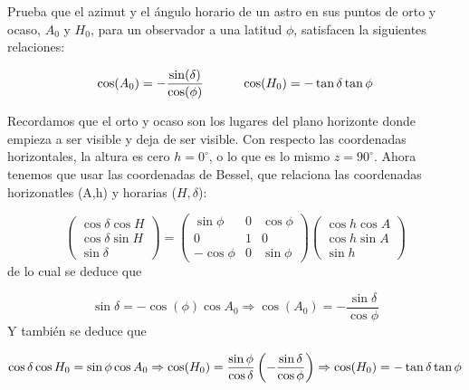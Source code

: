 \tcbstartrecording
\begin{texercise}
	
	Prueba que el azimut y el ángulo horario de un astro en sus puntos de orto y ocaso, $A_0$ y $H_0$, para un observador a una latitud $\phi$, satisfacen la siguientes relaciones:
	
	\begin{equation}
		\cos (A_0) = - \frac{\sin (\delta)}{\cos (\phi)} \quad \quad \quad \cos (H_0) = - \tan \delta \tan \phi
	\end{equation}
	\tcblower

	Recordamos que el orto y ocaso son los lugares del plano horizonte donde empieza a ser visible y deja de ser visible. Con respecto las coordenadas horizontales, la altura es cero $h=0^\circ$, o lo que es lo mismo $z=90^\circ$. Ahora tenemos que usar las coordenadas de Bessel, que relaciona las coordenadas horizonatles (A,h) y horarias ($H,\delta$):
	
	\begin{equation}
	\begin{pmatrix}
		\cos \delta \cos H \\
		\cos \delta \sin H \\
		\sin \delta 
	\end{pmatrix} =\begin{pmatrix}
		\sin \phi & 0 & \cos \phi \\
		0 & 1 & 0 \\
		- \cos \phi & 0 & \sin \phi
	\end{pmatrix}
	\begin{pmatrix}
		\cos h \cos A \\
		\cos h \sin A \\
		\sin h
	\end{pmatrix}
	\end{equation}
	de lo cual se deduce que
	
	\begin{equation}
	\sin \delta = - \cos (\phi) \cos A_0  \Rightarrow \cos (A_0) = - \frac{\sin \delta}{\cos \phi}
	\end{equation}
	Y también se deduce que
	
	\begin{equation}
	\cos \delta \cos H_0 = \sin \phi \cos A_0 \Rightarrow \cos (H_0) = \frac{\sin \phi}{\cos \delta} \left(  - \frac{\sin \delta}{\cos \phi} \right) \Rightarrow \cos (H_0) = - \tan \delta \tan \phi
	\end{equation}
\end{texercise}

